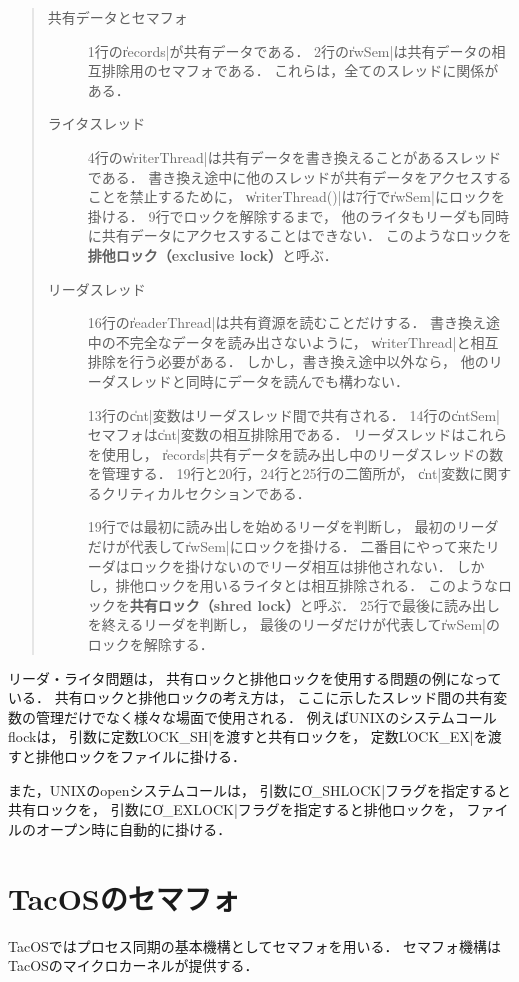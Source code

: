 \begin{quote}
\begin{description}
\item [共有データとセマフォ]
1行の\|records|が共有データである．
2行の\|rwSem|は共有データの相互排除用のセマフォである．
これらは，全てのスレッドに関係がある．

\item [ライタスレッド]
4行の\|writerThread|は共有データを書き換えることがあるスレッドである．
書き換え途中に他のスレッドが共有データをアクセスすることを禁止するために，
\|writerThread()|は7行で\|rwSem|にロックを掛ける．
9行でロックを解除するまで，
他のライタもリーダも同時に共有データにアクセスすることはできない．
このようなロックを{\bf 排他ロック（exclusive lock）}と呼ぶ．

\item [リーダスレッド]
16行の\|readerThread|は共有資源を読むことだけする．
書き換え途中の不完全なデータを読み出さないように，
\|writerThread|と相互排除を行う必要がある．
しかし，書き換え途中以外なら，
他のリーダスレッドと同時にデータを読んでも構わない．

13行の\|cnt|変数はリーダスレッド間で共有される．
14行の\|cntSem|セマフォは\|cnt|変数の相互排除用である．
リーダスレッドはこれらを使用し，
\|records|共有データを読み出し中のリーダスレッドの数を管理する．
19行と20行，24行と25行の二箇所が，
\|cnt|変数に関するクリティカルセクションである．

19行では最初に読み出しを始めるリーダを判断し，
最初のリーダだけが代表して\|rwSem|にロックを掛ける．
二番目にやって来たリーダはロックを掛けないのでリーダ相互は排他されない．
しかし，排他ロックを用いるライタとは相互排除される．
このようなロックを{\bf 共有ロック（shred lock）}と呼ぶ．
25行で最後に読み出しを終えるリーダを判断し，
最後のリーダだけが代表して\|rwSem|のロックを解除する．
\end{description}
\end{quote}

リーダ・ライタ問題は，
共有ロックと排他ロックを使用する問題の例になっている．
共有ロックと排他ロックの考え方は，
ここに示したスレッド間の共有変数の管理だけでなく様々な場面で使用される．
例えばUNIXのシステムコールflockは，
引数に定数\|LOCK_SH|を渡すと共有ロックを，
定数\|LOCK_EX|を渡すと排他ロックをファイルに掛ける．

また，UNIXのopenシステムコールは，
引数に\|O_SHLOCK|フラグを指定すると共有ロックを，
引数に\|O_EXLOCK|フラグを指定すると排他ロックを，
ファイルのオープン時に自動的に掛ける．

\section{TacOSのセマフォ}
TacOSではプロセス同期の基本機構としてセマフォを用いる．
セマフォ機構はTacOSのマイクロカーネルが提供する．

